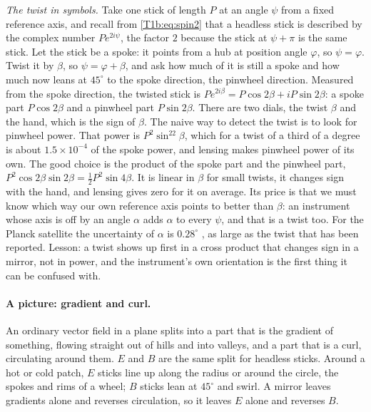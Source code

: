 \emph{The twist in symbols.} Take one stick of length $P$ at an angle $\psi$ from a fixed reference axis, and recall from \cref{T1b:eq:spin2} that a headless stick is described by the complex number $Pe^{2i\psi}$, the factor $2$ because the stick at $\psi+\pi$ is the same stick. Let the stick be a spoke: it points from a hub at position angle $\varphi$, so $\psi=\varphi$. Twist it by $\beta$, so $\psi=\varphi+\beta$, and ask how much of it is still a spoke and how much now leans at $45^\circ$ to the spoke direction, the pinwheel direction. Measured from the spoke direction, the twisted stick is $Pe^{2i\beta}=P\cos2\beta+iP\sin2\beta$: a spoke part $P\cos2\beta$ and a pinwheel part $P\sin2\beta$. There are two dials, the twist $\beta$ and the hand, which is the sign of $\beta$. The naive way to detect the twist is to look for pinwheel power. That power is $P^2\sin^22\beta$, which for a twist of a third of a degree is about $1.5\times10^{-4}$ of the spoke power, and lensing makes pinwheel power of its own. The good choice is the product of the spoke part and the pinwheel part, $P^2\cos2\beta\sin2\beta=\frac12P^2\sin4\beta$. It is linear in $\beta$ for small twists, it changes sign with the hand, and lensing gives zero for it on average. Its price is that we must know which way our own reference axis points to better than $\beta$: an instrument whose axis is off by an angle $\alpha$ adds $\alpha$ to every $\psi$, and that is a twist too. For the Planck satellite the uncertainty of $\alpha$ is $0.28^\circ$ \cite{MinamiKomatsu2020}, as large as the twist that has been reported. Lesson: a twist shows up first in a cross product that changes sign in a mirror, not in power, and the instrument's own orientation is the first thing it can be confused with.

\paragraph{A picture: gradient and curl.} An ordinary vector field in a plane splits into a part that is the gradient of something, flowing straight out of hills and into valleys, and a part that is a curl, circulating around them. $E$ and $B$ are the same split for headless sticks. Around a hot or cold patch, $E$ sticks line up along the radius or around the circle, the spokes and rims of a wheel; $B$ sticks lean at $45^\circ$ and swirl. A mirror leaves gradients alone and reverses circulation, so it leaves $E$ alone and reverses $B$.

